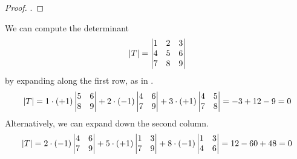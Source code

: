 \begin{proof}
.
\end{proof}

\begin{example} \label{ex:ExpLaPlace}
We can compute the determinant
\begin{equation*}
   \deter{T}=
   \begin{vmatrix}
     1  &2  &3  \\
     4  &5  &6  \\
     7  &8  &9
   \end{vmatrix}
\end{equation*}
by expanding along the first row, as in
.
\begin{equation*}
   \deter{T}
   =1\cdot(+1)\begin{vmatrix}
                5  &6  \\
                8  &9
              \end{vmatrix}
   +2\cdot(-1)\begin{vmatrix}
                4  &6  \\
                7  &9
              \end{vmatrix}
   +3\cdot(+1)\begin{vmatrix}
                4  &5  \\
                7  &8
              \end{vmatrix}     
  =-3+12-9     
  =0
\end{equation*}
Alternatively, we can expand down the second column.
\begin{equation*}
   \deter{T}
   =2\cdot(-1)\begin{vmatrix}
                4  &6  \\
                7  &9
              \end{vmatrix}
   +5\cdot(+1)\begin{vmatrix}
                1  &3  \\
                7  &9
              \end{vmatrix}
   +8\cdot(-1)\begin{vmatrix}
                1  &3  \\
                4  &6
              \end{vmatrix}     
  =12-60+48   
  =0
\end{equation*}
\end{example}

